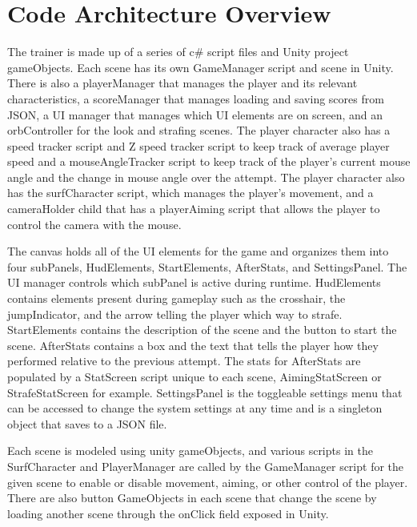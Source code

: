 \documentclass[10pt,twocolumn]{article}
\begin{document}
\section{Code Architecture Overview}
The trainer is made up of a series of c\# script files and Unity project gameObjects. Each scene has its own GameManager script and scene in Unity. There is also a playerManager that manages the player and its relevant characteristics, a scoreManager that manages loading and saving scores from JSON, a UI manager that manages which UI elements are on screen, and an orbController for the look and strafing scenes. The player character also has a speed tracker script and Z speed tracker script to keep track of average player speed and a mouseAngleTracker script to keep track of the player's current mouse angle and the change in mouse angle over the attempt. The player character also has the surfCharacter script, which manages the player's movement, and a cameraHolder child that has a playerAiming script that allows the player to control the camera with the mouse. 

The canvas holds all of the UI elements for the game and organizes them into four subPanels, HudElements, StartElements, AfterStats, and SettingsPanel. The UI manager controls which subPanel is active during runtime. HudElements contains elements present during gameplay such as the crosshair, the jumpIndicator, and the arrow telling the player which way to strafe. StartElements contains the description of the scene and the button to start the scene. AfterStats contains a box and the text that tells the player how they performed relative to the previous attempt. The stats for AfterStats are populated by a StatScreen script unique to each scene, AimingStatScreen or StrafeStatScreen for example. SettingsPanel is the toggleable settings menu that can be accessed to change the system settings at any time and is a singleton object that saves to a JSON file.

Each scene is modeled using unity gameObjects, and various scripts in the SurfCharacter and PlayerManager are called by the GameManager script for the given scene to enable or disable movement, aiming, or other control of the player. There are also button GameObjects in each scene that change the scene by loading another scene through the onClick field exposed in Unity. 
\end{document}
